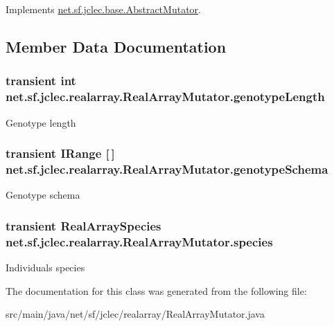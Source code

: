 Implements \hyperlink{classnet_1_1sf_1_1jclec_1_1base_1_1_abstract_mutator_ad12e6a2be8fb6082255ce8f399c9b166}{net.\-sf.\-jclec.\-base.\-Abstract\-Mutator}.



\subsection{Member Data Documentation}
\hypertarget{classnet_1_1sf_1_1jclec_1_1realarray_1_1_real_array_mutator_ae64eaf5a204082d653c2835187d7bc4c}{
\subsubsection[{genotype\-Length}]{\setlength{\rightskip}{0pt plus 5cm}transient int net.\-sf.\-jclec.\-realarray.\-Real\-Array\-Mutator.\-genotype\-Length\hspace{0.3cm}{\ttfamily [protected]}}}\label{classnet_1_1sf_1_1jclec_1_1realarray_1_1_real_array_mutator_ae64eaf5a204082d653c2835187d7bc4c}
Genotype length \hypertarget{classnet_1_1sf_1_1jclec_1_1realarray_1_1_real_array_mutator_a42aae3ccf5bf754d3556eac85d2ad56a}{
\subsubsection[{genotype\-Schema}]{\setlength{\rightskip}{0pt plus 5cm}transient {\bf I\-Range} \mbox{[}$\,$\mbox{]} net.\-sf.\-jclec.\-realarray.\-Real\-Array\-Mutator.\-genotype\-Schema\hspace{0.3cm}{\ttfamily [protected]}}}\label{classnet_1_1sf_1_1jclec_1_1realarray_1_1_real_array_mutator_a42aae3ccf5bf754d3556eac85d2ad56a}
Genotype schema \hypertarget{classnet_1_1sf_1_1jclec_1_1realarray_1_1_real_array_mutator_ab32eb06096bd2c5f6bc2ed29a16304fc}{
\subsubsection[{species}]{\setlength{\rightskip}{0pt plus 5cm}transient {\bf Real\-Array\-Species} net.\-sf.\-jclec.\-realarray.\-Real\-Array\-Mutator.\-species\hspace{0.3cm}{\ttfamily [protected]}}}\label{classnet_1_1sf_1_1jclec_1_1realarray_1_1_real_array_mutator_ab32eb06096bd2c5f6bc2ed29a16304fc}
Individuals species 

The documentation for this class was generated from the following file\-:\begin{DoxyCompactItemize}
\item 
src/main/java/net/sf/jclec/realarray/Real\-Array\-Mutator.\-java\end{DoxyCompactItemize}
